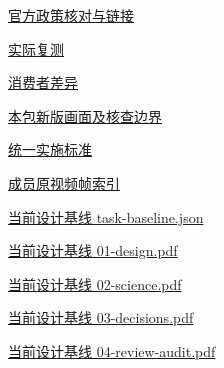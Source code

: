\documentclass[11pt,a4paper]{article}
\begin{document}
\href{file:///D:/Agent/srp/agent/tasks/W-03/evidence/official-review.md}{官方政策核对与链接}


\href{file:///D:/Agent/srp/agent/tasks/W-03/evidence/verification.json}{实际复测}


\href{file:///D:/Agent/srp/agent/tasks/W-03/evidence/consumer-impact.md}{消费者差异}


\href{file:///D:/Agent/srp/agent/tasks/W-03/outputs/current-implementation-evidence.md}{本包新版画面及核查边界}


\href{file:///D:/Agent/srp/agent/design/weather/2026-10-08_Storm\%E4\%B8\%8E\%E7\%BA\%AF\%E7\%B2\%92\%E5\%AD\%90\%E5\%8F\%8C\%E7\%8E\%AF\%E5\%AE\%9E\%E6\%96\%BD\%E6\%A0\%87\%E5\%87\%86.md}{统一实施标准}


\href{file:///D:/Agent/srp/human/assets/previews/2026-10-08/member-storm-particle-rings/frame-index.json}{成员原视频帧索引}


\href{file:///D:/Agent/srp/agent/design/design-foundation-20261008/task-baseline.json}{当前设计基线 task-\allowbreak{}baseline.json}


\href{file:///D:/Agent/srp/agent/design/design-foundation-20261008/01-design.pdf}{当前设计基线 01-\allowbreak{}design.pdf}


\href{file:///D:/Agent/srp/agent/design/design-foundation-20261008/02-science.pdf}{当前设计基线 02-\allowbreak{}science.pdf}


\href{file:///D:/Agent/srp/agent/design/design-foundation-20261008/03-decisions.pdf}{当前设计基线 03-\allowbreak{}decisions.pdf}


\href{file:///D:/Agent/srp/agent/design/design-foundation-20261008/04-review-audit.pdf}{当前设计基线 04-\allowbreak{}review-\allowbreak{}audit.pdf}
\end{document}
